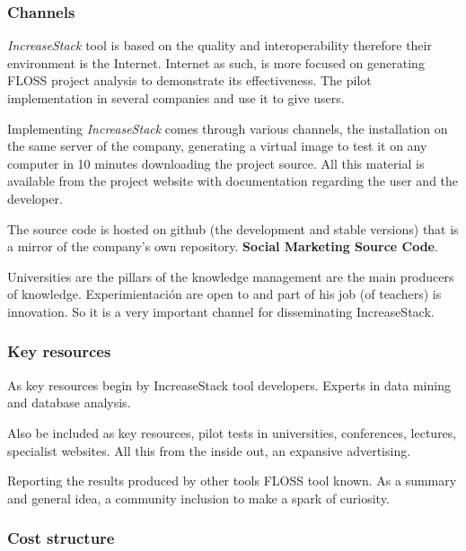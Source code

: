 \documentclass[11pt]{scrartcl}
\begin{document}
\subsubsection{Channels}

\par \emph{IncreaseStack} tool is based on the quality and interoperability therefore their environment is the Internet. Internet as such, is more focused on generating FLOSS project analysis to demonstrate its effectiveness. The pilot implementation in several companies and use it to give users.

\par Implementing \emph{IncreaseStack} comes through various channels, the installation on the same server of the company, generating a virtual image to test it on any computer in 10 minutes downloading the project source. All this material is available from the project website with documentation regarding the user and the developer.

\par The source code is hosted on github (the development and stable versions) that is a mirror of the company's own repository. \textbf{Social Marketing Source Code}.

\par Universities are the pillars of the knowledge management are the main producers of knowledge. Experimientación are open to and part of his job (of teachers) is innovation. So it is a very important channel for disseminating IncreaseStack.

\subsubsection{Key resources}

\par As key resources begin by IncreaseStack tool developers. Experts in data mining and database analysis.

\par Also be included as key resources, pilot tests in universities, conferences, lectures, specialist websites. All this from the inside out, an expansive advertising.
\par Reporting the results produced by other tools FLOSS tool known. As a summary and general idea, a community inclusion to make a spark of curiosity.
    
\subsubsection{Cost structure}
\end{document}
